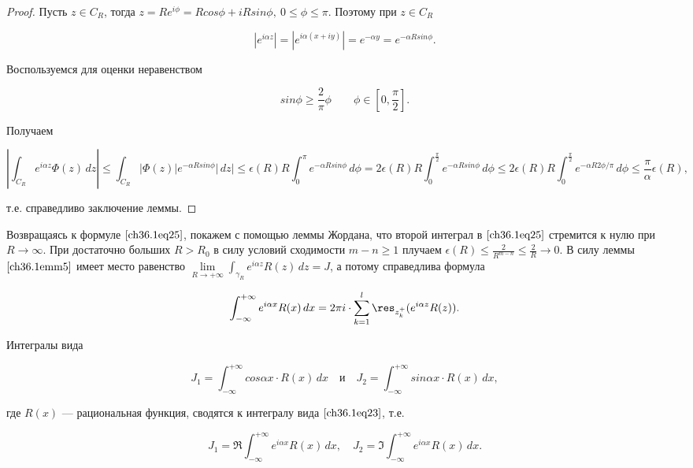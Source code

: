 \begin{proof}
Пусть $z \in C_R$, тогда $z = Re^{i\phi} = Rcos\phi + iRsin\phi, \: 0 \le \phi \le \pi$. Поэтому при $z \in C_R$

$$
|e^{i \alpha z}| = |e^{i \alpha(x + iy)}| = e^{-\alpha y} = e^{- \alpha R sin\phi}.
$$

Воспользуемся для оценки неравенством

\begin{equation} \label{ch36.1eq26}
sin \phi \ge \frac{2}{\pi}\phi \quad \text{} \quad \phi \in \left[ 0, \frac{\pi}{2}\right].
\end{equation}

Получаем

$$
\left| \int_{C_R} e^{i \alpha z} \Phi(z)\,dz \right| \le \int_{C_R} |\Phi(z)|e^{-\alpha R sin \phi}|\,dz| \le \epsilon(R)R \int_0^\pi e^{-\alpha R sin\phi} \,d\phi = 2\epsilon(R)R \int_0^{\frac{\pi}{2}} e^{-\alpha R sin\phi} \,d\phi \le 2\epsilon(R)R \int_0^{\frac{\pi}{2}} e^{-\alpha R 2\phi / \pi} \,d\phi \le \frac{\pi}{\alpha} \epsilon(R),
$$

т.е. справедливо заключение леммы.
\end{proof}

Возвращаясь к формуле $\eqref{ch36.1eq25}$, покажем с помощью леммы Жордана, что второй интеграл в $\eqref{ch36.1eq25}$ стремится к нулю при $R \to \infty$. При достаточно больших $R > R_0$ в силу условий сходимости $m - n \ge 1$ плучаем $\epsilon(R) \le \frac{2}{R^{m - n}} \le \frac{2}{R} \to 0$. В силу леммы  $\eqref{ch36.1emm5}$ имеет место равенство $\lim\limits_{R \to +\infty} \int_{\gamma_R} e^{i \alpha z}R(z) \,dz = J$, а потому справедлива формула

\begin{equation} \label{ch36.1eq27}
\int_{-\infty}^{+\infty} e^{i \alpha x}R(x) \,dx = 2\pi i \cdot \sum_{k = 1}^l \res_{z_k^+} (e^{i \alpha z}R(z)).
\end{equation}

\begin{cons} \label{ch36.1cons2}
Интегралы вида

\begin{equation} \label{ch36.1eq28}
J_1 = \int_{-\infty}^{+\infty} cos\alpha x \cdot R(x) \,dx \quad \text{и} \quad J_2 = \int_{-\infty}^{+\infty} sin \alpha x \cdot R(x) \,dx,
\end{equation}

где $R(x)$ --- рациональная функция, сводятся к интегралу вида $\eqref{ch36.1eq23}$, т.е.

$$
J_1 = \Re \int_{-\infty}^{+\infty} e^{i \alpha x} R(x) \,dx, \quad J_2 = \Im \int_{-\infty}^{+\infty} e^{i \alpha x}R(x) \,dx.
$$
\end{cons}
